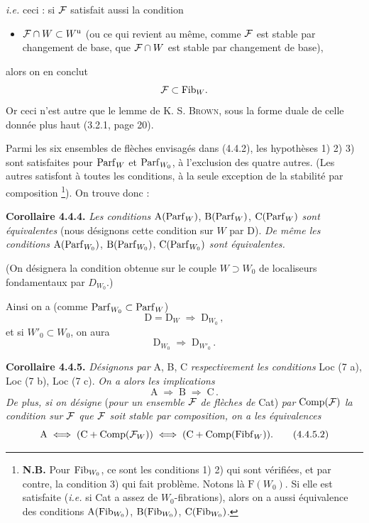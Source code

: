 \textit{i.e.} ceci : si $\mathcal{F}$ satisfait aussi la condition
\begin{itemize}[leftmargin=3em]
\item[4)] $\mathcal{F} \cap W \subset W^{\mathrm{u}}$ (ou ce qui revient au même, comme $\mathcal{F}$ est stable par changement de base, que $\mathcal{F} \cap W$ est stable par changement de base),
\end{itemize}
alors on en conclut
\[
\mathcal{F} \subset \mathrm{Fib}_W.
\]
Or ceci n'est autre que le lemme de K. S. \textsc{Brown}, sous la forme duale de celle donnée plus haut (3.2.1, page 20).

Parmi les six ensembles de flèches envisagés dans (4.4.2), les hypothèses 1) 2) 3) sont satisfaites pour $\mathrm{Parf}_W$ et $\mathrm{Parf}_{W_0}$, à l'exclusion des quatre autres. (Les autres satisfont à toutes les conditions, à la seule exception de la stabilité par composition \footnote[30]{\textbf{N.B.} Pour $\mathrm{Fib}_{W_0}$, ce sont les conditions 1) 2) qui sont vérifiées, et par contre, la condition 3) qui fait problème. Notons là $\mathrm{F}(W_0)$. Si elle est satisfaite (\textit{i.e.} si Cat a assez de $W_0$-fibrations), alors on a aussi équivalence des conditions $\mathrm{A}(\mathrm{Fib}_{W_0})$, $\mathrm{B}(\mathrm{Fib}_{W_0})$, $\mathrm{C}(\mathrm{Fib}_{W_0})$.}). On trouve donc :

\textbf{Corollaire 4.4.4.} \textit{Les conditions} $\mathrm{A}(\mathrm{Parf}_W)$, $\mathrm{B}(\mathrm{Parf}_W)$, $\mathrm{C}(\mathrm{Parf}_W)$ \textit{sont équivalentes} (nous désignons cette condition sur $W$ par D). \textit{De même les conditions} $\mathrm{A}(\mathrm{Parf}_{W_0})$, $\mathrm{B}(\mathrm{Parf}_{W_0})$, $\mathrm{C}(\mathrm{Parf}_{W_0})$ \textit{sont équivalentes.}


(On désignera la condition obtenue sur le couple $W \supset W_0$ de localiseurs fondamentaux par $D_{W_0}$.)

Ainsi on a (comme $\mathrm{Parf}_{W_0} \subset \mathrm{Parf}_W$)
\[
\mathrm{D} = \mathrm{D}_W \;\Longrightarrow\; \mathrm{D}_{W_0}\,,
\tag*{(4.4.4)}
\]
et si $W'_0 \subset W_0$, on aura
\[
\mathrm{D}_{W_0} \;\Longrightarrow\; \mathrm{D}_{W'_0}\,.
\tag*{(4.4.5)}
\]

\textbf{Corollaire 4.4.5.} \textit{Désignons par} A, B, C \textit{respectivement les conditions} Loc (7 a), Loc (7 b), Loc (7 c). \textit{On a alors les implications}
\[
\mathrm{A} \;\Longrightarrow\; \mathrm{B} \;\Longrightarrow\; \mathrm{C}\,.
\tag*{(4.4.5.1)}
\]
\textit{De plus, si on désigne} (\textit{pour un ensemble $\mathcal{F}$ de flèches de} Cat) \textit{par} $\mathrm{Comp}(\mathcal{F})$ \textit{la condition sur $\mathcal{F}$ que $\mathcal{F}$ soit stable par composition, on a les équivalences}
\[
\mathrm{A} \iff (\mathrm{C} + \Comp(\cF_W)) \iff (\mathrm{C} + \Comp(\Fibf_W)).
\tag*{(4.4.5.2)}
\]


